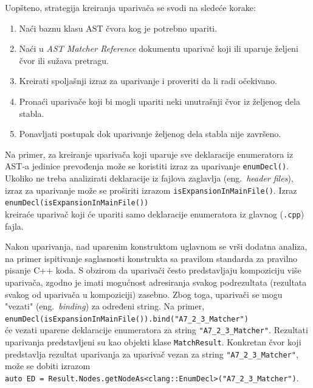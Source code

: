 \documentclass[12pt,oneside]{memoir}
\begin{document}
Uopšteno, strategija kreiranja upariva\v{c}a se svodi na sledeće korake:
\begin{enumerate}
\item Na\'{c}i baznu klasu AST \v{c}vora kog je potrebno upariti.
 
\item Na\'{c}i u \textit{AST Matcher Reference} dokumentu \cite{ASTMatcherReference} upariva\v{c} koji ili uparuje \v{z}eljeni čvor ili su\v{z}ava pretragu.
\item Kreirati spoljašnji izraz za uparivanje i proveriti da li radi o\v{c}ekivano.
\item Prona\'{c}i upariva\v{c}e koji bi mogli upariti neki unutrašnji čvor iz željenog dela stabla.
\item Ponavljati postupak dok uparivanje željenog dela stabla nije završeno.
\end{enumerate}

\par
Na primer, za kreiranje upariva\v{c}a koji uparuje sve deklaracije enumeratora iz AST-a jedinice prevođenja mo\v{z}e se koristiti izraz za uparivanje \texttt{enumDecl()}. Ukoliko ne treba analizirati deklaracije iz fajlova zaglavlja (eng.~\textit{header files}), izraz za uparivanje mo\v{z}e se pro\v{s}iriti izrazom \texttt{isExpansionInMainFile()}. Izraz \\ \texttt{enumDecl(isExpansionInMainFile())} \\ kreira\'{c}e upariva\v{c} koji \'{c}e upariti samo deklaracije enumeratora iz glavnog (\texttt{.cpp}) fajla.

Nakon uparivanja, nad uparenim konstruktom uglavnom se vr\v{s}i dodatna analiza, na primer ispitivanje saglasnosti konstrukta sa pravilom standarda za pravilno pisanje C++ koda.
S obzirom da upariva\v{c}i \v{c}esto predstavljaju kompoziciju vi\v{s}e upariva\v{c}a, zgodno je imati mogu\'{c}nost adresiranja svakog podrezultata (rezultata svakog od upariva\v{c}a u kompoziciji) zasebno.
Zbog toga, upariva\v{c}i se mogu "vezati" (eng.~\textit{binding}) za određeni string. Na primer, \\
\texttt{enumDecl(isExpansionInMainFile()).bind("A7\_2\_3\_Matcher")} \\ će vezati uparene deklaracije enumeratora za string \texttt{"A7\_2\_3\_Matcher"}. Rezultati uparivanja predstavljeni su kao objekti klase \texttt{MatchResult}. Konkretan \v{c}vor koji predstavlja rezultat uparivanja za upariva\v{c} vezan za string \texttt{"A7\_2\_3\_Matcher"},
mo\v{z}e se dobiti izrazom \\ \texttt{auto ED = Result.Nodes.getNodeAs<clang::EnumDecl>("A7\_2\_3\_Matcher")}.
\end{document}
